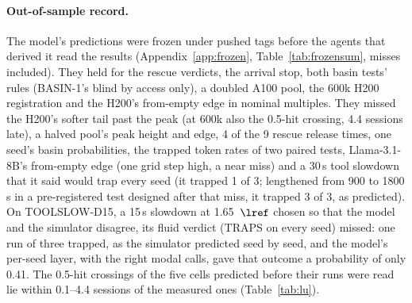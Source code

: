 \paragraph{Out-of-sample record.} The model's predictions were frozen under pushed tags before the agents that derived it read
the results (Appendix~\ref{app:frozen}, Table~\ref{tab:frozensum}, misses included). They held for the rescue verdicts, the
arrival stop, both basin tests' rules (BASIN-1's blind by access only), a doubled A100 pool, the 600k H200 registration and the H200's from-empty edge in nominal
multiples. They missed the H200's softer tail past the peak (at 600k also the 0.5-hit crossing, 4.4 sessions late), a halved
pool's peak height and edge, 4 of the 9 rescue release times, one seed's basin probabilities, the trapped token rates of two
paired tests, Llama-3.1-8B's from-empty edge (one grid step high, a near miss) and a 30\,s tool slowdown that it said would
trap every seed (it trapped 1 of 3; lengthened from 900 to 1800\,s in a pre-registered test designed after that miss, it trapped 3
of 3, as predicted). On TOOLSLOW-D15, a 15\,s slowdown at 1.65~$\lref$ chosen so that the model and the simulator disagree, its
fluid verdict (TRAPS on every seed) missed: one run of three trapped, as the simulator predicted seed by seed, and the model's
per-seed layer, with the right modal calls, gave that outcome a probability of only 0.41. The 0.5-hit crossings of the five cells
predicted before their runs were read lie within 0.1--4.4 sessions of the measured ones (Table~\ref{tab:lu}).

